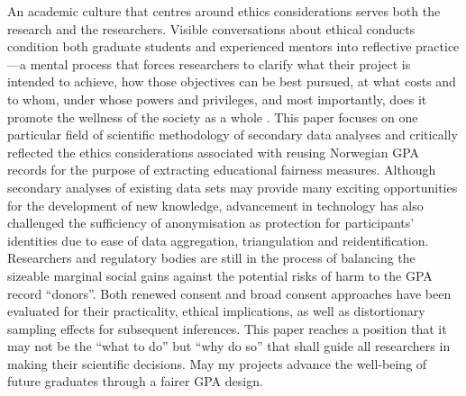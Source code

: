 \documentclass[
        a4paper, %
        12pt, %
        stu, %
        noextraspace, %
        floatsintext, %
        biblatex, %
        twoside, %
        colorlinks=true,        %
        linkcolor=red,          %
        anchorcolor=red,      %
        citecolor=blue,         %
        urlcolor=blue,          %
        bookmarks=true,         %
        bookmarksopen=false,    %
        bookmarksnumbered=true,  %
        dvipsnames
]{apa7}
\begin{document}
An academic culture that centres around ethics considerations serves both the research and the researchers. Visible conversations about ethical conducts condition both graduate students and experienced mentors into reflective practice---a mental process that forces researchers to clarify what their project is intended to achieve, how those objectives can be best pursued, at what costs and to whom, under whose powers and privileges, and most importantly, does it promote the wellness of the society as a whole \parencite{crow:2006}. This paper focuses on one particular field of scientific methodology of secondary data analyses and critically reflected the ethics considerations associated with reusing Norwegian GPA records for the purpose of extracting educational fairness measures. Although secondary analyses of existing data sets may provide many exciting opportunities for the development of new knowledge, advancement in technology has also challenged the sufficiency of anonymisation as protection for participants' identities due to ease of data aggregation, triangulation and reidentification. Researchers and regulatory bodies are still in the process of balancing the sizeable marginal social gains against the potential risks of harm to the GPA record ``donors''. Both renewed consent and broad consent approaches have been evaluated for their practicality, ethical implications, as well as distortionary sampling effects for subsequent inferences. This paper reaches a position that it may not be the ``what to do'' but ``why do so'' that shall guide all researchers in making their scientific decisions. May my projects advance the well-being of future graduates through a fairer GPA design.

\printbibliography
\end{document}
